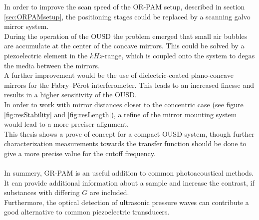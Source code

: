 In order to improve the scan speed of the OR-PAM setup, described in section \ref{sec:ORPAMsetup}, the positioning stages could be replaced by a scanning galvo mirror system. \\
During the operation of the OUSD the problem emerged that small air bubbles are accumulate at the center of the concave mirrors. This could be solved by a piezoelectric element in the $kHz$-range, which is coupled onto the system to degas the media between the mirrors. \\
A further improvement would be the use of dielectric-coated plano-concave mirrors for the Fabry–P\'{e}rot interferometer. This leads to an increased finesse and results in a higher sensitivity of the OUSD. \\
In order to work with mirror distances closer to the  concentric case (see figure \ref{fig:resStability} and \ref{fig:resLength}), a refine of the mirror mounting system would lead to a more preciser alignment.\\
This thesis shows a prove of concept for a compact OUSD system, though further characterization measurements towards the transfer function should be done to give a more precise value for the cutoff frequency.  \\ 
\\
 In summery, GR-PAM is an useful addition to common photoacoustical methods. It can provide additional information about a sample and increase the contrast, if substances with differing $G$ are included.\\
 Furthermore, the optical detection of ultrasonic pressure waves can contribute a good alternative to common piezoelectric transducers.